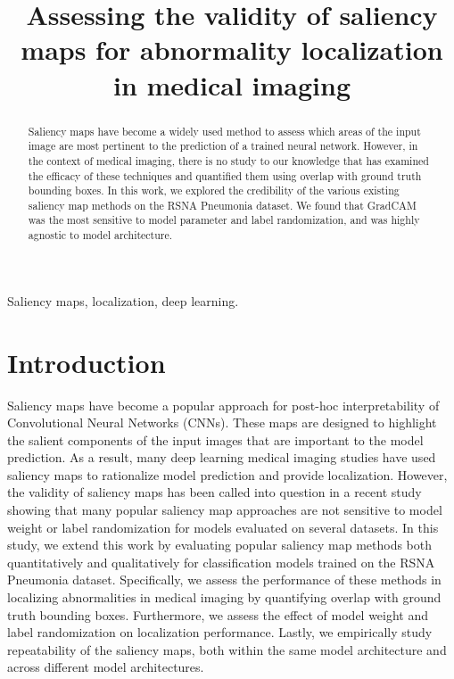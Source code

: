 \documentclass{midl} %
\title[Assessing the validity of saliency maps for abnormality localization in medical imaging]{Assessing the validity of saliency maps for abnormality localization in medical imaging}
\begin{document}
\maketitle

\begin{abstract}
Saliency maps have become a widely used method to assess which areas of the input image are most pertinent to the prediction of a trained neural network. However, in the context of medical imaging, there is no study to our knowledge that has examined the efficacy of these techniques and quantified them using overlap with ground truth bounding boxes. In this work, we explored the credibility of the various existing saliency map methods on the RSNA Pneumonia dataset.  We found that GradCAM was the most sensitive to model parameter and label randomization, and was highly agnostic to model architecture.
\end{abstract}

\begin{keywords}
Saliency maps, localization, deep learning.
\end{keywords}

\section{Introduction}
Saliency maps have become a popular approach for post-hoc interpretability of Convolutional Neural Networks (CNNs). \cite{adebayo2018sanity} These maps are designed to highlight the salient components of the input images that are important to the model prediction. As a result, many deep learning medical imaging studies have used saliency maps to rationalize model prediction and provide localization. \cite{rajpurkar2017chexnet,bien2018deep,mitani2019detection} However, the validity of saliency maps has been called into question in a recent study showing that many popular saliency map approaches are not sensitive to model weight or label randomization for models evaluated on several datasets. \cite{adebayo2018sanity} In this study, we extend this work by evaluating popular saliency map methods both quantitatively and qualitatively for classification models trained  on the RSNA Pneumonia dataset. \cite{shih2019augmenting} Specifically, we assess the performance of these methods in localizing abnormalities in medical imaging by quantifying overlap with ground truth bounding boxes. Furthermore, we assess the effect of model weight and label randomization on localization performance. Lastly, we empirically study repeatability of the saliency maps, both within the same model architecture and across different model architectures.
\end{document}
